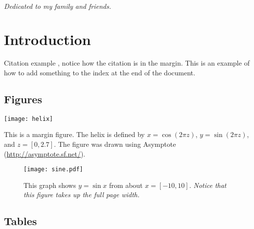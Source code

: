 \documentclass{tufte-book}
\begin{document}
\cleardoublepage
~\vfill
\begin{doublespace}
\noindent\fontsize{18}{22}\selectfont\itshape
\nohyphenation
Dedicated to my family and friends.
\end{doublespace}
\vfill
\vfill


\cleardoublepage
\chapter*{Introduction} %

Citation example \cite{Tufte2001}, notice how the citation is in the margin. This is an 
example of how to add something to the index at the end of the document.


\section{Figures}

\lipsum[1] 

\begin{marginfigure}
\texttt{[image: helix]}
\caption{This is a margin figure. The helix is defined by 
$x = \cos(2\pi z)$, $y = \sin(2\pi z)$, and $z = [0, 2.7]$. The figure was drawn using
 Asymptote (\url{http://asymptote.sf.net/}).}
\label{fig:marginfig}
\end{marginfigure}

\lipsum[2]

\begin{figure*}[h]
\texttt{[image: sine.pdf]}
\caption{This graph shows $y = \sin x$ from about $x = [-10, 10]$.
\emph{Notice that this figure takes up the full page width.}}
\label{fig:fullfig}
\end{figure*}

\lipsum[3]


\section{Tables} 
\end{document}
